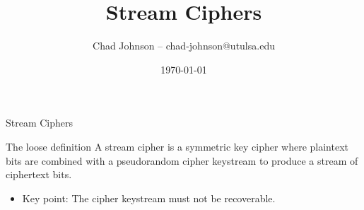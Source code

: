 \documentclass[12pt]{beamer}
\title[Introduction to Cryptography]{Stream Ciphers}
\author{Chad Johnson -- chad-johnson@utulsa.edu}
\institute{University of Tulsa\\
Tulsa, Oklahoma 74104}
\date{\today}
\begin{document}
\lstset{
language=python,                %
showspaces=false,               %
showstringspaces=false,         %
showtabs=false,                 %
tabsize=4,	                %
}

\newtheorem{mydef}{Definition}

\begin{frame}
\titlepage
\end{frame}

\begin{frame}{Stream Ciphers}{}
\begin{block}{The loose definition}
A stream cipher is a symmetric key cipher where plaintext bits are combined with a pseudorandom cipher keystream to produce a stream of ciphertext bits.
\begin{itemize}
	\item Key point: The cipher keystream must not be recoverable.
\end{itemize}
\end{block}
\end{frame}
\end{document}
